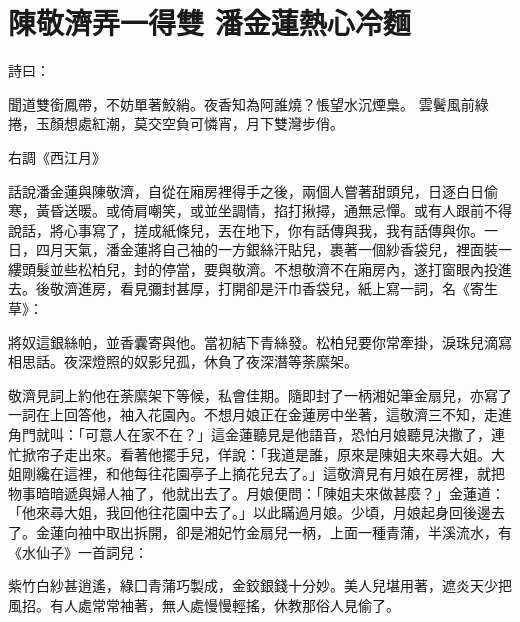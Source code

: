 %

\chapter{陳敬濟弄一得雙 潘金蓮熱心冷麵}

\begin{showcontents}{}


詩曰：

聞道雙銜鳳帶，不妨單著鮫綃。夜香知為阿誰燒？悵望水沉煙梟。
雲鬢風前綠捲，玉顏想處紅潮，莫交空負可憐宵，月下雙灣步俏。

右調《西江月》

話說潘金蓮與陳敬濟，自從在廂房裡得手之後，兩個人嘗著甜頭兒，日逐白日偷寒，黃昏送暖。或倚肩嘲笑，或並坐調情，掐打揪撏，通無忌憚。或有人跟前不得說話，將心事寫了，搓成紙條兒，丟在地下，你有話傳與我，我有話傳與你。一日，四月天氣，潘金蓮將自己袖的一方銀絲汗貼兒，裹著一個紗香袋兒，裡面裝一縷頭髮並些松柏兒，封的停當，要與敬濟。不想敬濟不在廂房內，遂打窗眼內投進去。後敬濟進房，看見彌封甚厚，打開卻是汗巾香袋兒，紙上寫一詞，名《寄生草》：

將奴這銀絲帕，並香囊寄與他。當初結下青絲發。松柏兒要你常牽掛，淚珠兒滴寫相思話。夜深燈照的奴影兒孤，休負了夜深潛等荼縻架。

敬濟見詞上約他在荼縻架下等候，私會佳期。隨即封了一柄湘妃筆金扇兒，亦寫了一詞在上回答他，袖入花園內。不想月娘正在金蓮房中坐著，這敬濟三不知，走進角門就叫：「可意人在家不在？」這金蓮聽見是他語音，恐怕月娘聽見決撒了，連忙掀帘子走出來。看著他擺手兒，佯說：「我道是誰，原來是陳姐夫來尋大姐。大姐剛纔在這裡，和他每往花園亭子上摘花兒去了。」這敬濟見有月娘在房裡，就把物事暗暗遞與婦人袖了，他就出去了。月娘便問：「陳姐夫來做甚麼？」金蓮道： 「他來尋大姐，我回他往花園中去了。」以此瞞過月娘。少頃，月娘起身回後邊去了。金蓮向袖中取出拆開，卻是湘妃竹金扇兒一柄，上面一種青蒲，半溪流水，有《水仙子》一首詞兒：

紫竹白紗甚逍遙，綠囗青蒲巧製成，金鉸銀錢十分妙。美人兒堪用著，遮炎天少把風招。有人處常常袖著，無人處慢慢輕搖，休教那俗人見偷了。


\end{showcontents}
